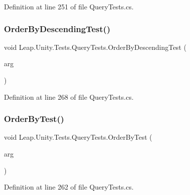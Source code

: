 Definition at line 251 of file Query\+Tests.\+cs.

\mbox{\label{class_leap_1_1_unity_1_1_tests_1_1_query_tests_a2bbb69deffc98452e8b387438485c01f}} 
\subsubsection{\texorpdfstring{OrderByDescendingTest()}{OrderByDescendingTest()}}
{\footnotesize\ttfamily void Leap.\+Unity.\+Tests.\+Query\+Tests.\+Order\+By\+Descending\+Test (\begin{DoxyParamCaption}\item[{\mbox{[}\+Value\+Source(\char`\"{}list0\char`\"{})\mbox{]} \mbox{\hyperlink{class_leap_1_1_unity_1_1_tests_1_1_query_tests_1_1_query_arg}{Query\+Arg}}}]{arg }\end{DoxyParamCaption})}



Definition at line 268 of file Query\+Tests.\+cs.

\mbox{\label{class_leap_1_1_unity_1_1_tests_1_1_query_tests_a7ea493534f3b6a7dc1d376d5c6cd4d70}} 
\subsubsection{\texorpdfstring{OrderByTest()}{OrderByTest()}}
{\footnotesize\ttfamily void Leap.\+Unity.\+Tests.\+Query\+Tests.\+Order\+By\+Test (\begin{DoxyParamCaption}\item[{\mbox{[}\+Value\+Source(\char`\"{}list0\char`\"{})\mbox{]} \mbox{\hyperlink{class_leap_1_1_unity_1_1_tests_1_1_query_tests_1_1_query_arg}{Query\+Arg}}}]{arg }\end{DoxyParamCaption})}



Definition at line 262 of file Query\+Tests.\+cs.

\mbox{\label{class_leap_1_1_unity_1_1_tests_1_1_query_tests_ae009f348590b2db73ccbeb78f7b642cb}} 
